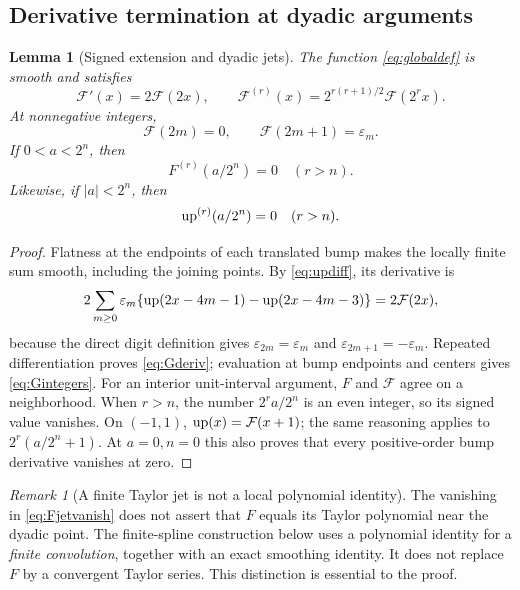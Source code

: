 \documentclass[11pt,oneside]{article}
\newtheorem{lemma}[theorem]{Lemma}
\theoremstyle{definition}\newtheorem{definition}[theorem]{Definition}
\theoremstyle{remark}\newtheorem{remark}[theorem]{Remark}
\newcommand{\G}{\mathcal F}\newcommand{\eps}{\varepsilon}
\begin{document}
\subsection{Derivative termination at dyadic arguments}
\begin{lemma}[Signed extension and dyadic jets]
\label{lem:jets}
The function \eqref{eq:globaldef} is smooth and satisfies
\begin{equation}
 \G'(x)=2\G(2x),\qquad
 \G^{(r)}(x)=2^{r(r+1)/2}\G(2^r x).
 \label{eq:Gderiv}
\end{equation}
At nonnegative integers,
\begin{equation}
 \G(2m)=0,\qquad \G(2m+1)=\eps_m.
 \label{eq:Gintegers}
\end{equation}
If $0<a<2^n$, then
\begin{equation}
 F^{(r)}(a/2^n)=0\quad(r>n).
 \label{eq:Fjetvanish}
\end{equation}
Likewise, if $|a|<2^n$, then
\begin{equation}
 \operatorname{up}^{(r)}(a/2^n)=0\quad(r>n).
 \label{eq:upjetvanish}
\end{equation}
\end{lemma}
\begin{proof}
Flatness at the endpoints of each translated bump makes the locally finite
sum smooth, including the joining points. By \eqref{eq:updiff}, its derivative
is
\[
 2\sum_{m\ge0}\eps_m\{\Up(2x-4m-1)-\Up(2x-4m-3)\}=2\G(2x),
\]
because the direct digit definition gives $\eps_{2m}=\eps_m$ and
$\eps_{2m+1}=-\eps_m$. Repeated differentiation proves
\eqref{eq:Gderiv}; evaluation at bump endpoints and centers gives
\eqref{eq:Gintegers}.
For an interior unit-interval argument, $F$ and $\G$ agree on a neighborhood.
When $r>n$, the number $2^r a/2^n$ is an even integer, so its signed value
vanishes. On $(-1,1)$, $\Up(x)=\G(x+1)$; the same reasoning applies to
$2^r(a/2^n+1)$. At $a=0,n=0$ this also proves that every positive-order
bump derivative vanishes at zero.
\end{proof}

\begin{remark}[A finite Taylor jet is not a local polynomial identity]
The vanishing in \eqref{eq:Fjetvanish} does not assert that $F$ equals its
Taylor polynomial near the dyadic point. The finite-spline construction below
uses a polynomial identity for a \emph{finite convolution}, together with an
exact smoothing identity. It does not replace $F$ by a convergent Taylor
series. This distinction is essential to the proof.
\end{remark}
\end{document}
